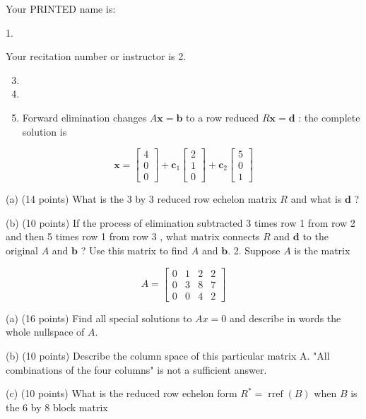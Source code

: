 \documentclass[10pt]{article}
\begin{document}
Your PRINTED name is:

1.

Your recitation number or instructor is 2.

\begin{enumerate}
  \setcounter{enumi}{2}
  \item 
  \item 
  \item Forward elimination changes $A \mathbf{x}=\mathbf{b}$ to a row reduced $R \mathbf{x}=\mathbf{d}$ : the complete solution is

\end{enumerate}

$$
\mathbf{x}=\left[\begin{array}{l}
4 \\
0 \\
0
\end{array}\right]+\mathbf{c}_{1}\left[\begin{array}{l}
2 \\
1 \\
0
\end{array}\right]+\mathbf{c}_{2}\left[\begin{array}{l}
5 \\
0 \\
1
\end{array}\right]
$$

(a) (14 points) What is the 3 by 3 reduced row echelon matrix $R$ and what is $\mathbf{d}$ ?

(b) (10 points) If the process of elimination subtracted 3 times row 1 from row 2 and then 5 times row 1 from row 3 , what matrix connects $R$ and $\mathbf{d}$ to the original $A$ and $\mathbf{b}$ ? Use this matrix to find $A$ and $\mathbf{b}$. 2. Suppose $A$ is the matrix

$$
A=\left[\begin{array}{llll}
0 & 1 & 2 & 2 \\
0 & 3 & 8 & 7 \\
0 & 0 & 4 & 2
\end{array}\right]
$$

(a) (16 points) Find all special solutions to $A x=0$ and describe in words the whole nullspace of $A$.

(b) (10 points) Describe the column space of this particular matrix A. "All combinations of the four columns" is not a sufficient answer.

(c) (10 points) What is the reduced row echelon form $R^{*}=\operatorname{rref}(B)$ when $B$ is the 6 by 8 block matrix
\end{document}
